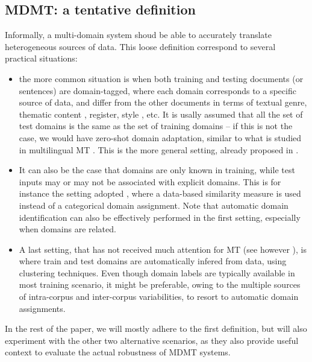 \documentclass[11pt]{article}
\newcommand{\fyTodo}[1]{\Todo[FY:]{\textcolor{orange}{#1}}}
\begin{document}
\subsection{MDMT: a tentative definition}
Informally, a multi-domain system shoud be able to accurately translate heterogeneous sources of data. This loose definition correspond to several practical situations:
\begin{itemize}
\item the more common situation is when both training and testing documents (or sentences) are domain-tagged, where each domain corresponds to a specific source of data, and differ from the other documents in terms of textual genre, thematic content \cite{Zhang16topicinformed}, register, style \cite{Niu18multitask}, etc. It is usally assumed that all the set of test domains is the same as the set of training domains -- if this is not the case, we would have zero-shot domain adaptation, similar to what is studied in multilingual MT \cite{Firat16multiway,Ha16towards,Johnson17google,Platanios18contextual}. This is the more general setting, already proposed in \cite{Dredze09multidomain}.\fyTodo{do we need a name: such as supervised MDMT ? and mostly supervised MDMT for the second case ?}

\item It can also be the case that domains are only known in training, while test inputs may or may not be associated with explicit domains. This is for instance the setting adopted \cite{Farajian17multidomain}, where a data-based similarity measure is used instead of a categorical domain assignment. Note that automatic domain identification can also be effectively performed in the first setting, especially when domains are related.
  
\item A last setting, that has not received much attention for MT (see however \cite{Sennrich13multidomain}), is where train and test domains are automatically infered from data, using clustering techniques. Even though domain labels are typically available in most training scenario, it might be preferable, owing to the multiple sources of intra-corpus and inter-corpus variabilities, to resort to automatic domain assignments.
\end{itemize}

In the rest of the paper, we will mostly adhere to the first definition, but will also experiment with the other two alternative scenarios, as they also provide useful context to evaluate the actual robustness of MDMT systems.
\end{document}
